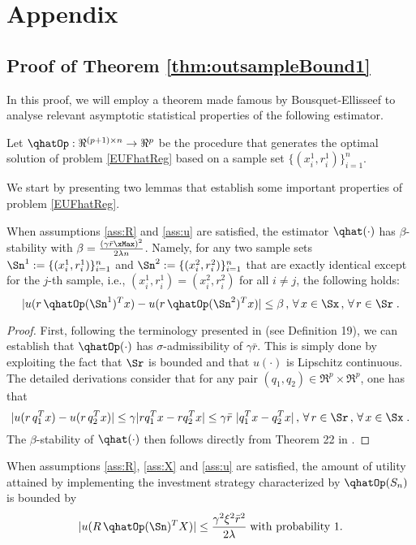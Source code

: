 \section{Appendix}

\subsection{Proof of Theorem \ref{thm:outsampleBound1}}

In this proof, we will employ a theorem made famous by Bousquet-Ellisseef to analyse relevant asymptotic statistical properties of the following estimator.
\begin{definition}
Let $\qhatOp:\Re^{(p+1)\times n}\rightarrow \Re^p$ be the procedure that generates the optimal solution of problem \eqref{EUFhatReg} based on a sample set $\{(x_i^1,r_i^1)\}_{i=1}^n$. 
\end{definition}

We start by presenting two lemmas that establish some important properties of problem \eqref{EUFhatReg}. 
\begin{lemma}\label{beta-bound}
  When assumptions \ref{ass:R} and \ref{ass:u}  are satisfied, the estimator $\bold{\qhat}(\cdot)$ has $\beta$-stability with $ \beta = \frac{(\gamma\bar r\xMax)^2}{2\lambda n}$. Namely, for any two sample sets $\Sn^1:=\{(x_i^1,r_i^1)\}_{i=1}^n$ and $\Sn^2:=\{(x_i^2,r_i^2)\}_{i=1}^n$ that are exactly identical except for the $j$-th sample, i.e., $(x_i^1,r_i^1)=(x_i^2,r_i^2)$ for all $i\neq j$, the following holds:
  \[
    |u(r\,\qhatOp(\Sn^1)^T x) - u(r\,\qhatOp(\Sn^2)^T x)| \leq \beta\,,\,\forall\,x\in\Sx\,,\,\forall\,r\in\Sr\;.
  \]
\end{lemma}
\begin{proof}
First, following the terminology presented in   \cite{bousquet2002stability} (see Definition 19), we can establish that $\qhatOp(\cdot)$ has $\sigma$-admissibility of $\gamma\bar{r}$. This is simply done by exploiting the fact that $\Sr$ is bounded and that $u(\cdot)$ is Lipschitz continuous. The detailed derivations consider that for any pair $(q_1,q_2)\in\Re^p\times\Re^p$, one has that
\[ |u(r\,q_1^T x) - u(r\,q_2^T x)| \leq \gamma |rq_1^Tx - rq_2^Tx|\leq \gamma\bar{r}\ |q_1^Tx - q_2^Tx| \,,\,\forall\,r\in\Sr\,,\,\forall\,x\in\Sx\;.\]
 The $\beta$-stability of $\bold{\qhat}(\cdot)$ then follows directly from Theorem 22 in \cite{bousquet2002stability}.
\end{proof}

\begin{lemma}  \label{u-bound}
  When assumptions \ref{ass:R}, \ref{ass:X} and \ref{ass:u}  are satisfied, the amount of utility attained by implementing the investment strategy characterized by $\qhatOp(S_n)$ is bounded by
\[|u(R\,\qhatOp(\Sn)^TX)|\leq \frac{\gamma^2\xi^2 \bar{r}^2}{2\lambda}\;\mbox{with probability $1$.}\]  
\end{lemma}

